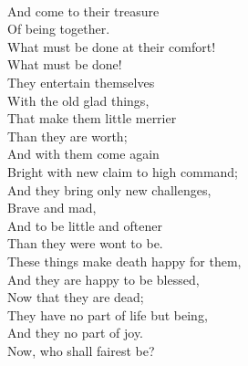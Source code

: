 \documentclass[smalldemyvopaper,11pt,twoside,onecolumn,openright,extrafontsizes]{memoir}
\begin{document}
\\And come to their treasure
\\Of being together.
\\What must be done at their comfort!
\\What must be done!
\\They entertain themselves
\\With the old glad things,
\\That make them little merrier
\\Than they are worth;
\\And with them come again
\\Bright with new claim to high command;
\\And they bring only new challenges,
\\Brave and mad,
\\And to be little and oftener
\\Than they were wont to be.
\\These things make death happy for them,
\\And they are happy to be blessed,
\\Now that they are dead;
\\They have no part of life but being,
\\And they no part of joy.
\\Now, who shall fairest be?
\end{document}
